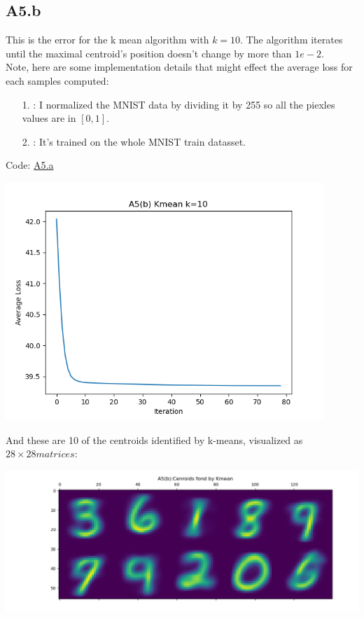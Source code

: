 \documentclass[]{article}
\begin{document}
    \subsection*{A5.b}
        This is the error for the k mean algorithm with $k = 10$. The algorithm iterates until the maximal centroid's position doesn't change by more than $1e-2$. 
        \\[1.1em]
        Note, here are some implementation details that might effect the average loss for each samples computed: 
        \begin{enumerate}
            \item[1.]: I normalized the MNIST data by dividing it by 255 so all the piexles values are in $[0, 1]$. 
            \item[2.]: It's trained on the whole MNIST train datasset.  
        \end{enumerate}
        Code: \hyperref[A5.a]{A5.a}
        \begin{center}
            \includegraphics*[width=12cm]{A5bplots/23-09-12-A5b-k=10-losses.png}    
        \end{center}    
        And these are 10 of the centroids identified by k-means, visualized as $28\times 28 matrices$: 
        \begin{center}
            \includegraphics*[width=14cm]{A5bplots/23-09-12-A5b-k=10-centroids.png}
        \end{center}
\end{document}
